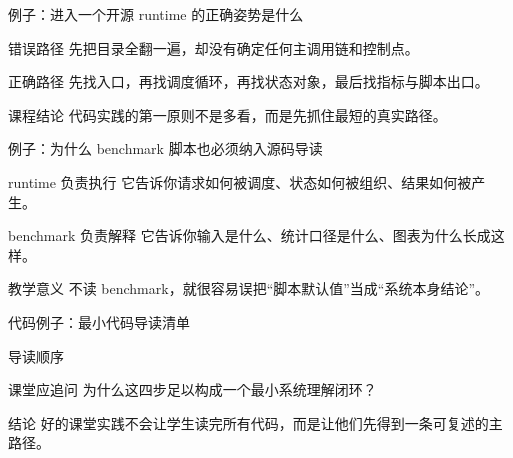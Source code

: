 \begin{frame}{例子：进入一个开源 runtime 的正确姿势是什么}
  \begin{block}{错误路径}
    先把目录全翻一遍，却没有确定任何主调用链和控制点。
  \end{block}
  \pause
  \begin{block}{正确路径}
    先找入口，再找调度循环，再找状态对象，最后找指标与脚本出口。
  \end{block}
  \pause
  \begin{block}{课程结论}
    代码实践的第一原则不是多看，而是先抓住最短的真实路径。
  \end{block}
\end{frame}

\begin{frame}{例子：为什么 benchmark 脚本也必须纳入源码导读}
  \begin{block}{runtime 负责执行}
    它告诉你请求如何被调度、状态如何被组织、结果如何被产生。
  \end{block}
  \pause
  \begin{block}{benchmark 负责解释}
    它告诉你输入是什么、统计口径是什么、图表为什么长成这样。
  \end{block}
  \pause
  \begin{block}{教学意义}
    不读 benchmark，就很容易误把“脚本默认值”当成“系统本身结论”。
  \end{block}
\end{frame}

\begin{frame}{代码例子：最小代码导读清单}
  \begin{block}{导读顺序}
    {\ttfamily\small
    \par
    \par
    \par
    \par
    }
  \end{block}
  \pause
  \begin{block}{课堂应追问}
    为什么这四步足以构成一个最小系统理解闭环？
  \end{block}
  \pause
  \begin{block}{结论}
    好的课堂实践不会让学生读完所有代码，而是让他们先得到一条可复述的主路径。
  \end{block}
\end{frame}

